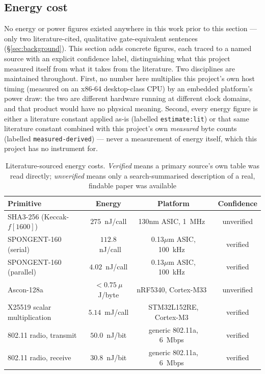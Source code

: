 \documentclass[11pt,a4paper]{article}
\begin{document}
\subsection{Energy cost}
\label{subsec:energy}

No energy or power figures existed anywhere in this work prior to this section
--- only two literature-cited, qualitative gate-equivalent sentences
(\S\ref{sec:background}). This section adds concrete figures, each traced to a
named source with an explicit confidence label, distinguishing what this project
measured itself from what it takes from the literature. Two disciplines are
maintained throughout. First, no number here multiplies this project's own
host timing (measured on an x86-64 desktop-class CPU) by an embedded platform's
power draw: the two are different hardware running at different clock domains,
and that product would have no physical meaning. Second, every energy figure is
either a literature constant applied as-is (labelled \texttt{estimate:lit}) or
that same literature constant combined with this project's own \emph{measured}
byte counts (labelled \texttt{measured-derived}) --- never a measurement of
energy itself, which this project has no instrument for.

\begin{table}[H]
\centering
\caption{Literature-sourced energy costs. \emph{Verified} means a primary
source's own table was read directly; \emph{unverified} means only a
search-summarised description of a real, findable paper was available}
\label{tab:energy}
\small
\begin{tabular}{@{}p{4.3cm}ccc@{}}
\toprule
\textbf{Primitive} & \textbf{Energy} & \textbf{Platform} & \textbf{Confidence} \\
\midrule
SHA3-256 (Keccak-$f[1600]$) & $275$~nJ/call & 130nm ASIC, 1~MHz~\cite{sha3_energy_pessl} & unverified \\
SPONGENT-160 (serial) & $112.8$~nJ/call & 0.13$\mu$m ASIC, 100~kHz~\cite{spongent_original} & verified \\
SPONGENT-160 (parallel) & $4.02$~nJ/call & 0.13$\mu$m ASIC, 100~kHz~\cite{spongent_original} & verified \\
Ascon-128a & $<0.75~\mu$J/byte & nRF5340, Cortex-M33~\cite{ascon_energy_sorescu} & unverified \\
X25519 scalar multiplication & $5.14$~mJ/call & STM32L152RE, Cortex-M3~\cite{x25519_energy_franck} & verified \\
802.11 radio, transmit & $50.0$~nJ/bit & generic 802.11a, 6~Mbps~\cite{radio_energy_ergen} & verified \\
802.11 radio, receive & $30.8$~nJ/bit & generic 802.11a, 6~Mbps~\cite{radio_energy_ergen} & verified \\
\bottomrule
\end{tabular}
\end{table}
\end{document}
